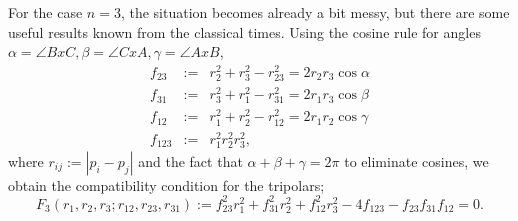 \documentclass{article}
\begin{document}
For the case $n=3$, the situation becomes already a bit messy, but there are some useful results known from the classical times. Using the cosine rule for angles $\alpha = \angle BxC, \beta =\angle CxA, \gamma = \angle AxB$, 
\begin{eqnarray}
f_{23} & := & r_2^2 + r_3^2 - r_{23}^2 = 2r_2r_3\cos{\alpha}\\
f_{31} & := & r_3^2 + r_1^2 - r_{31}^2 = 2r_1r_3\cos{\beta}\\
f_{12} & := & r_1^2 + r_2^2 - r_{12}^2 = 2r_1r_2\cos{\gamma}\\
f_{123} & := & r_1^2 r_2^2 r_3^2,
\end{eqnarray}
where $r_{ij}:=|p_i-p_j|$ and the fact that $\alpha + \beta + \gamma = 2\pi$ to eliminate cosines, we obtain the compatibility condition for the tripolars;
\begin{equation}
\label{eq:tri_compat}
F_3(r_1,r_2,r_3;r_{12},r_{23},r_{31}) := f_{23}^2 r_1^2 + f_{31}^2 r_2^2 + f_{12}^2 r_3^2 - 4 f_{123} - f_{23} f_{31} f_{12} = 0.
\end{equation}
\end{document}
